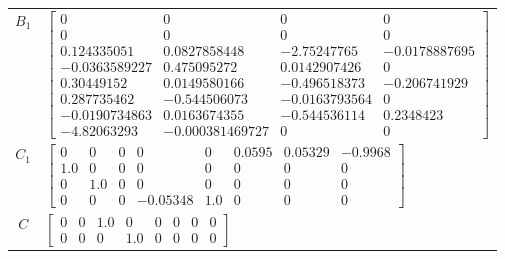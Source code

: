 \begin{tabular}{cl}
 $B_{1}$  & $\left[\begin{matrix}0 & 0 & 0 & 0\\0 & 0 & 0 & 0\\0.124335051 & 0.0827858448 & -2.75247765 & -0.0178887695\\-0.0363589227 & 0.475095272 & 0.0142907426 & 0\\0.30449152 & 0.0149580166 & -0.496518373 & -0.206741929\\0.287735462 & -0.544506073 & -0.0163793564 & 0\\-0.0190734863 & 0.0163674355 & -0.544536114 & 0.2348423\\-4.82063293 & -0.000381469727 & 0 & 0\end{matrix}\right]$                                                                                                                                                                                                                                                                                                                                                                                  \\
 $C_{1}$  & $\left[\begin{matrix}0 & 0 & 0 & 0 & 0 & 0.0595 & 0.05329 & -0.9968\\1.0 & 0 & 0 & 0 & 0 & 0 & 0 & 0\\0 & 1.0 & 0 & 0 & 0 & 0 & 0 & 0\\0 & 0 & 0 & -0.05348 & 1.0 & 0 & 0 & 0\end{matrix}\right]$                                                                                                                                                                                                                                                                                                                                                                                                                                                                                                                                                                         \\
   $C$    & $\left[\begin{matrix}0 & 0 & 1.0 & 0 & 0 & 0 & 0 & 0\\0 & 0 & 0 & 1.0 & 0 & 0 & 0 & 0\end{matrix}\right]$                                                                                                                                                                                                                                                                                                                                                                                                                                                                                                                                                                                                                                                                 \\

\end{tabular}
